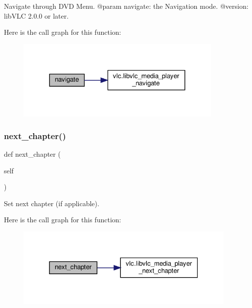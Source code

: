 \begin{DoxyVerb}Navigate through DVD Menu.
@param navigate: the Navigation mode.
@version: libVLC 2.0.0 or later.
\end{DoxyVerb}
 Here is the call graph for this function\+:
\nopagebreak
\begin{figure}[H]
\begin{center}
\leavevmode
\includegraphics[width=287pt]{classvlc_1_1_media_player_ac74a3e90cc0bce1cb4e98a8c95977ffd_cgraph}
\end{center}
\end{figure}
\mbox{\label{classvlc_1_1_media_player_a0dfd349d09abc14a2a49c0ff66761fc7}} 
\subsubsection{\texorpdfstring{next\+\_\+chapter()}{next\_chapter()}}
{\footnotesize\ttfamily def next\+\_\+chapter (\begin{DoxyParamCaption}\item[{}]{self }\end{DoxyParamCaption})}

\begin{DoxyVerb}Set next chapter (if applicable).
\end{DoxyVerb}
 Here is the call graph for this function\+:
\nopagebreak
\begin{figure}[H]
\begin{center}
\leavevmode
\includegraphics[width=307pt]{classvlc_1_1_media_player_a0dfd349d09abc14a2a49c0ff66761fc7_cgraph}
\end{center}
\end{figure}
\mbox{\label{classvlc_1_1_media_player_a702101a1321786e2dab4c8a342b73ca0}} 
